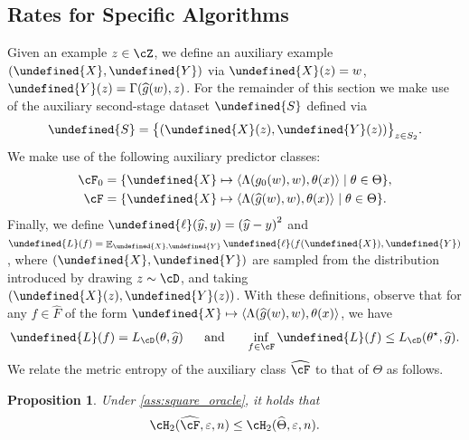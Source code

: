 \documentclass[11pt]{article} %
\newcommand{\pref}[1]{\cref{#1}}
\theoremstyle{theorem}  %
\newtheorem{proposition}{Proposition}
\theoremstyle{plain}
\DeclarePairedDelimiter{\crl}{\{}{\}}
\DeclarePairedDelimiter{\prn}{(}{)}
\DeclarePairedDelimiter{\tri}{\langle}{\rangle}
\DeclareMathOperator{\En}{\mathbb{E}}
\newcommand{\ls}{\ell}
\newcommand{\veps}{\varepsilon}
\newcommand{\wt}[1]{\widetilde{#1}}
\newcommand{\wh}[1]{\widehat{#1}}
\let\wt\undefined
\newcommand{\wt}[1]{\widetilde{#1}}
\newcommand{\yh}{\hat{y}}
\newcommand{\poprisk}{L_{\cD}}
\renewcommand{\yh}{\wh{y}}
\newcommand{\auxX}{\wt{X}}
\newcommand{\auxY}{\wt{Y}}
\newcommand{\auxL}{\wt{L}}
\newcommand{\varall}{z}
\newcommand{\varone}{w} %
\newcommand{\vartwo}{x} %
\newcommand{\estone}{\wh{g}}
\newcommand{\gtF}{\cF_{0}}
\newcommand{\estF}{\cF}
\newcommand{\target}{\Theta}
\newcommand{\targetemp}{\wh{\Theta}}
\newcommand{\besttwo}{\theta^{\star}}
\newcommand{\gtone}{g_0}
\newcommand{\sampletwo}{S_2}
\renewcommand{\hat}[1]{\wh{#1}}
\begin{document}
\subsection{Rates for Specific Algorithms}
\label{app:specific_rates}
Given an example $\varall\in\cZ$, we define an auxiliary example $(\wt{X},\wt{Y})$ via $\wt{X}(z)=\varone$, $\wt{Y}(z)=
\Gamma(\estone(w), z)$. For the remainder of this section we make use of the auxiliary second-stage dataset $\wt{S}$ defined via
\begin{equation}
\label{eq:auxS}
\wt{S} = \crl[\big]{(\wt{X}(z),\wt{Y}(z))}_{z\in\sampletwo}.
\end{equation}
We make use of the following auxiliary predictor classes:
\begin{align}
\gtF &= \crl*{\wt{X}\mapsto{}\tri*{\Lambda(\gtone(\varone),\varone),\theta(\vartwo)}\mid{}\theta\in\target}\label{eq:gtF},\\
\estF &= \crl*{\wt{X}\mapsto{}\tri*{\Lambda(\estone(\varone),\varone),\theta(\vartwo)}\mid{}\theta\in\target}\label{eq:empF}.%
\end{align}
Finally, we define $\wt{\ls}(\yh,y) = \prn*{\yh-y}^{2}$ and $\wt{L}(f) = \En_{\wt{X},\wt{Y}}\wt{\ls}(f(\wt{X}),\wt{Y})$, where $(\wt{X},\wt{Y})$ are sampled from the distribution introduced by drawing $z\sim{}\cD$, and taking $(\auxX(z),\auxY(z))$. With these definitions, observe that for any $f\in\wh{F}$ of the form $\wt{X}\mapsto{}\tri*{\Lambda(\estone(\varone),\varone),\theta(\vartwo)}$, we have
\begin{equation}
\label{eq:risk_relation}
\auxL(f) = \poprisk(\theta,\estone)\text{~~~~~and~~~~~}\inf_{f\in\cF}\auxL(f) \leq{} \poprisk(\besttwo,\estone).
\end{equation}
We relate the metric entropy of the auxiliary class $\wh{\cF}$ to that of $\target$ as follows.
\begin{proposition}
\label{prop:entropy_aux}
Under \pref{ass:square_oracle}, it holds that
\begin{equation}
\label{eq:entropy_aux}
\cH_2(\wh{\cF},\veps,n)\leq{}\cH_{2}(\targetemp,\veps,n).
\end{equation}

\end{proposition}
\end{document}
